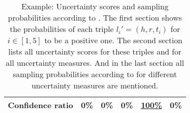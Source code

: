 \begin{table}[H]
\begin{tabular}{llllll}
        Confidence ratio
        & 0\% 
        & 0\% 
        & 0\% 
        & \underline{100\%}
        & 0\% \\
        
        \bottomrule
    \end{tabular}
    \caption{Example: Uncertainty scores and sampling probabilities according to \usmax. 
    The first section shows the probabilities of each triple $l_i' = (h, r, t_i)$ for $i \in [1,5]$ to be a positive one. 
    The second section lists all uncertainty scores for these triples and for all uncertainty measures.
    And in the last section all sampling probabilities according to \usmax for different uncertainty measures are mentioned.}
\label{tab:uncertainty_measure_example_max}
\end{table}